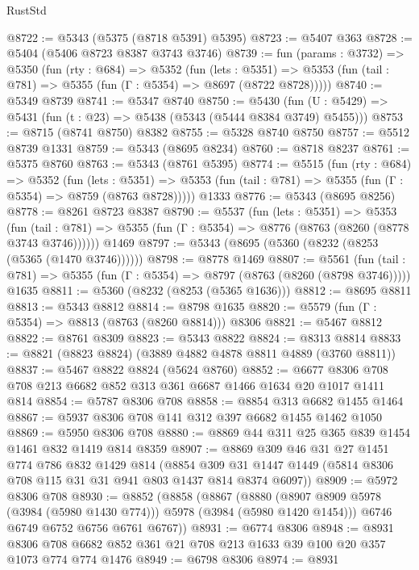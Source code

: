 \begin{lexlean}{RustStd}
\begin{coremodule}
@8722 := @5343 (@5375 (@8718 @5391) @5395)
@8723 := @5407 @363
@8728 := @5404 (@5406 @8723 @8387 @3743 @3746)
@8739 := fun (params : @3732) =>
  @5350
    (fun (rty : @684) =>
    @5352
      (fun (lets : @5351) =>
      @5353 (fun (tail : @781) => @5355 (fun (Γ : @5354) => @8697 (@8722 @8728)))))
@8740 := @5349 @8739
@8741 := @5347 @8740
@8750 := @5430 (fun (U : @5429) => @5431 (fun (t : @23) => @5438 (@5343 (@5444 @8384 @3749) @5455)))
@8753 := @8715 (@8741 @8750) @8382
@8755 := @5328 @8740 @8750
@8757 := @5512 @8739 @1331
@8759 := @5343 (@8695 @8234)
@8760 := @8718 @8237
@8761 := @5375 @8760
@8763 := @5343 (@8761 @5395)
@8774 := @5515
    (fun (rty : @684) =>
    @5352
      (fun (lets : @5351) =>
      @5353 (fun (tail : @781) => @5355 (fun (Γ : @5354) => @8759 (@8763 @8728)))))
    @1333
@8776 := @5343 (@8695 @8256)
@8778 := @8261 @8723 @8387
@8790 := @5537
    (fun (lets : @5351) =>
    @5353
      (fun (tail : @781) => @5355 (fun (Γ : @5354) => @8776 (@8763 (@8260 (@8778 @3743 @3746))))))
    @1469
@8797 := @5343 (@8695 (@5360 (@8232 (@8253 (@5365 (@1470 @3746))))))
@8798 := @8778 @1469
@8807 := @5561
    (fun (tail : @781) => @5355 (fun (Γ : @5354) => @8797 (@8763 (@8260 (@8798 @3746)))))
    @1635
@8811 := @5360 (@8232 (@8253 (@5365 @1636)))
@8812 := @8695 @8811
@8813 := @5343 @8812
@8814 := @8798 @1635
@8820 := @5579 (fun (Γ : @5354) => @8813 (@8763 (@8260 @8814))) @8306
@8821 := @5467 @8812
@8822 := @8761 @8309
@8823 := @5343 @8822
@8824 := @8313 @8814
@8833 := @8821 (@8823 @8824) (@3889 @4882 @4878 @8811 @4889 (@3760 @8811))
@8837 := @5467 @8822 @8824 (@5624 @8760)
@8852 := @6677 @8306 @708 @708 @213 @6682 @852 @313 @361 @6687 @1466 @1634 @20 @1017 @1411 @814
@8854 := @5787 @8306 @708
@8858 := @8854 @313 @6682 @1455 @1464
@8867 := @5937 @8306 @708 @141 @312 @397 @6682 @1455 @1462 @1050
@8869 := @5950 @8306 @708
@8880 := @8869 @44 @311 @25 @365 @839 @1454 @1461 @832 @1419 @814 @8359
@8907 := @8869
    @309
    @46
    @31
    @27
    @1451
    @774
    @786
    @832
    @1429
    @814
    (@8854 @309 @31 @1447 @1449 (@5814 @8306 @708 @115 @31 @31 @941 @803 @1437 @814 @8374 @6097))
@8909 := @5972 @8306 @708
@8930 := @8852
    (@8858
      (@8867
        (@8880 (@8907 @8909 @5978 (@3984 (@5980 @1430 @774))) @5978 (@3984 (@5980 @1420 @1454)))
        @6746
        @6749
        @6752
        @6756
        @6761
        @6767))
@8931 := @6774 @8306
@8948 := @8931
    @8306
    @708
    @6682
    @852
    @361
    @21
    @708
    @213
    @1633
    @39
    @100
    @20
    @357
    @1073
    @774
    @774
    @1476
@8949 := @6798 @8306
@8974 := @8931

\end{coremodule}
\end{lexlean}
